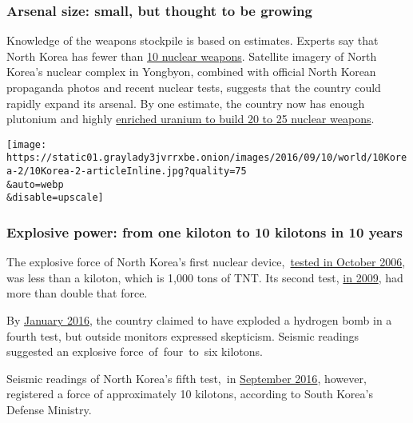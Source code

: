 \hypertarget{arsenal-size-small-but-thought-to-be-growing}{%
\subsubsection{\texorpdfstring{\textbf{Arsenal size: small, but thought
to be
growing}}{Arsenal size: small, but thought to be growing}}\label{arsenal-size-small-but-thought-to-be-growing}}

Knowledge of the weapons stockpile is based on estimates. Experts say
that North Korea has fewer than
\href{https://www.nytimes3xbfgragh.onion/interactive/2016/12/23/world/nuclear-weapon-countries.html}{10
nuclear weapons}. Satellite imagery of North Korea's nuclear complex in
Yongbyon, combined with official North Korean propaganda photos and
recent nuclear tests, suggests that the country could rapidly expand its
arsenal. By one estimate, the country now has enough plutonium and
highly
\href{https://www.nytimes3xbfgragh.onion/2017/01/12/opinion/the-us-must-talk-to-north-korea.html}{enriched
uranium to build 20 to 25 nuclear weapons}.

\texttt{[image: https://static01.graylady3jvrrxbe.onion/images/2016/09/10/world/10Korea-2/10Korea-2-articleInline.jpg?quality=75\\\&auto=webp\\\&disable=upscale]}

\hypertarget{explosive-power-from-one-kiloton-to-10-kilotons-in-10-years}{%
\subsubsection{\texorpdfstring{\textbf{Explosive power: from one kiloton
to 10 kilotons in 10
years}}{Explosive power: from one kiloton to 10 kilotons in 10 years}}\label{explosive-power-from-one-kiloton-to-10-kilotons-in-10-years}}

The explosive force of North Korea's first nuclear
device,~\href{http://www.nytimes3xbfgragh.onion/2006/10/09/world/asia/09korea.html}{tested
in October 2006}, was less than a kiloton, which is 1,000 tons of TNT.
Its second test,
\href{http://www.nytimes3xbfgragh.onion/2009/05/25/world/asia/25nuke.html}{in
2009}, had more than double that force.

By
\href{https://www.nytimes3xbfgragh.onion/2016/01/06/world/asia/north-korea-hydrogen-bomb-test.html}{January
2016}, the country claimed to have exploded a hydrogen bomb in a fourth
test, but outside monitors expressed skepticism. Seismic readings
suggested an explosive force~of~four~to~six kilotons.

Seismic readings of North Korea's fifth test,~in
\href{https://www.nytimes3xbfgragh.onion/2016/09/10/world/asia/north-korea-nuclear-weapons-tests.html}{September
2016}, however, registered a force of approximately 10 kilotons,
according to South Korea's Defense Ministry.

